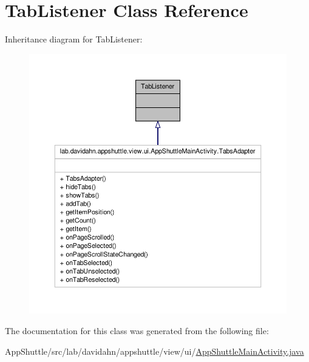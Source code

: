\hypertarget{class_action_bar_1_1_tab_listener}{\section{\-Tab\-Listener \-Class \-Reference}
\label{class_action_bar_1_1_tab_listener}
}


\-Inheritance diagram for \-Tab\-Listener\-:
\nopagebreak
\begin{figure}[H]
\begin{center}
\leavevmode
\includegraphics[width=350pt]{class_action_bar_1_1_tab_listener__inherit__graph}
\end{center}
\end{figure}


\-The documentation for this class was generated from the following file\-:\begin{DoxyCompactItemize}
\item 
\-App\-Shuttle/src/lab/davidahn/appshuttle/view/ui/\hyperlink{_app_shuttle_main_activity_8java}{\-App\-Shuttle\-Main\-Activity.\-java}\end{DoxyCompactItemize}
